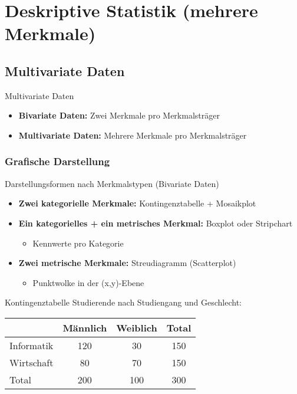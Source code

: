 \section{Deskriptive Statistik (mehrere Merkmale)}

\subsection{Multivariate Daten}

\begin{definition}{Multivariate Daten}
\begin{itemize}
    \item \textbf{Bivariate Daten:} Zwei Merkmale pro Merkmalsträger
    \item \textbf{Multivariate Daten:} Mehrere Merkmale pro Merkmalsträger
\end{itemize}
\end{definition}

\subsubsection{Grafische Darstellung}

\begin{concept}{Darstellungsformen nach Merkmalstypen (Bivariate Daten)}
\begin{itemize}
    \item \textbf{Zwei kategorielle Merkmale:} Kontingenztabelle + Mosaikplot
    \item \textbf{Ein kategorielles + ein metrisches Merkmal:} Boxplot oder Stripchart
    \begin{itemize}
        \item Kennwerte pro Kategorie
    \end{itemize}
    \item \textbf{Zwei metrische Merkmale:} Streudiagramm (Scatterplot)
    \begin{itemize}
        \item Punktwolke in der (x,y)-Ebene
    \end{itemize}
\end{itemize}
\end{concept}

\begin{example2}{Kontingenztabelle}
Studierende nach Studiengang und Geschlecht:
\begin{center}
\begin{tabular}{|l|c|c|c|}
\hline
 & Männlich & Weiblich & Total \\
\hline
Informatik & 120 & 30 & 150 \\
Wirtschaft & 80 & 70 & 150 \\
\hline
Total & 200 & 100 & 300 \\
\hline
\end{tabular}
\end{center}
\end{example2}

